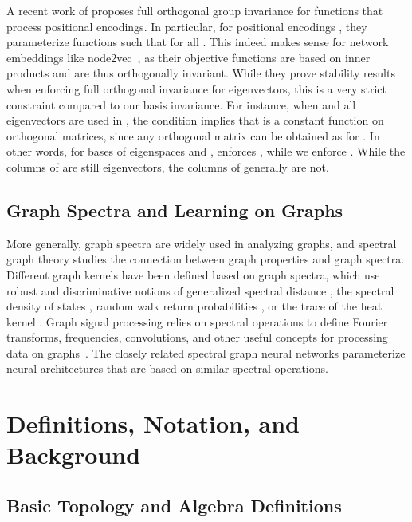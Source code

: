 \documentclass{article} \usepackage{iclr2023_conference,times}
\begin{document}
A recent work of \citet{wang2022equivariant} proposes full orthogonal group invariance for functions that process positional encodings. In particular, for positional encodings , they parameterize functions  such that  for all . This indeed makes sense for network embeddings like node2vec~\citep{grover2016node2vec}, as their objective functions are based on inner products and are thus orthogonally invariant. While they prove stability results when enforcing full orthogonal invariance for eigenvectors, this is a very strict constraint compared to our basis invariance. For instance, when  and all eigenvectors are used in , the condition  implies that  is a constant function on orthogonal matrices, since any orthogonal matrix  can be obtained as  for .
In other words, for bases of eigenspaces  and , \citet{wang2022equivariant} enforces , while we enforce . While the columns of  are still eigenvectors, the columns of  generally are not.


\subsection{Graph Spectra and Learning on Graphs}
More generally, graph spectra are widely used in analyzing graphs, and spectral graph theory \citep{chung1997spectral} studies the connection between graph properties and graph spectra. 
Different graph kernels have been defined based on graph spectra, which use robust and discriminative notions of generalized spectral distance \citep{verma2017hunt}, the spectral density of states \citep{huang2021density}, random walk return probabilities \citep{zhang2018retgk}, or the trace of the heat kernel \citep{tsitsulin2018netlsd}. 
Graph signal processing relies on spectral operations to define Fourier transforms, frequencies, convolutions, and other useful concepts for processing data on graphs~\citep{ortega2018graph}. The closely related spectral graph neural networks  \citep{wu2020comprehensive,balcilar2020analyzing} parameterize neural architectures that are based on similar spectral operations.


\section{Definitions, Notation, and Background}

\subsection{Basic Topology and Algebra Definitions}
\end{document}
